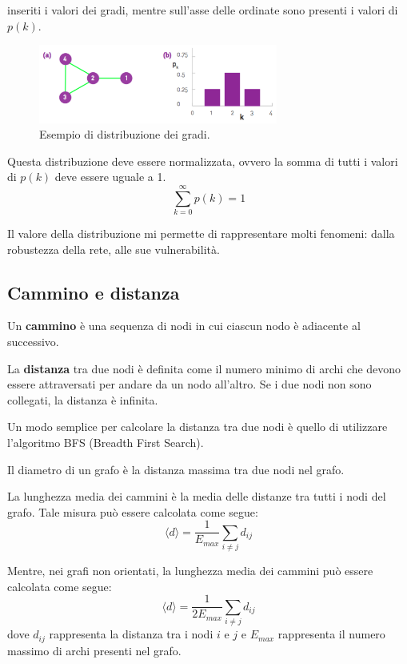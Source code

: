 inseriti i valori dei gradi, mentre sull'asse delle ordinate sono presenti i
valori di $p(k)$.
\begin{figure}[!ht]
    \centering
    \includegraphics[width=0.7\textwidth]{./img/net/degreedist.png}
    \caption{Esempio di distribuzione dei gradi.}
    \label{fig:degree_distribution}
\end{figure}
\begin{nota}
    Questa distribuzione deve essere normalizzata, ovvero la somma di tutti i
    valori di $p(k)$ deve essere uguale a 1.
    \begin{equation*}
        \sum_{k=0}^{\infty} p(k) = 1
    \end{equation*}
\end{nota}
Il valore della distribuzione mi permette di rappresentare molti fenomeni: dalla
robustezza della rete, alle sue vulnerabilità.
\subsection{Cammino e distanza}
\begin{definizione}
    Un \textbf{cammino} è una sequenza di nodi in cui ciascun nodo è adiacente
    al successivo.
\end{definizione}
\begin{definizione}
    La \textbf{distanza} tra due nodi è definita come il numero minimo di archi
    che devono essere attraversati per andare da un nodo all'altro. Se i due
    nodi non sono collegati, la distanza è infinita.
\end{definizione}
Un modo semplice per calcolare la distanza tra due nodi è quello di utilizzare
l'algoritmo BFS (Breadth First Search).
\begin{definizione}
    Il diametro di un grafo è la distanza massima tra due nodi nel grafo.
\end{definizione}
\begin{definizione}
    La lunghezza media dei cammini è la media delle distanze tra tutti i nodi
    del grafo. Tale misura può essere calcolata come segue:
    \begin{equation}
        \langle d \rangle = \frac{1}{E_{max}} \sum_{i \neq j} d_{ij}
    \end{equation}
\end{definizione}
Mentre, nei grafi non orientati, la lunghezza media dei cammini può essere calcolata
come segue:
\begin{equation}
    \langle d \rangle = \frac{1}{2E_{max}} \sum_{i \neq j} d_{ij}
\end{equation}
dove $d_{ij}$ rappresenta la distanza tra i nodi $i$ e $j$ e $E_{max}$ rappresenta
il numero massimo di archi presenti nel grafo.
